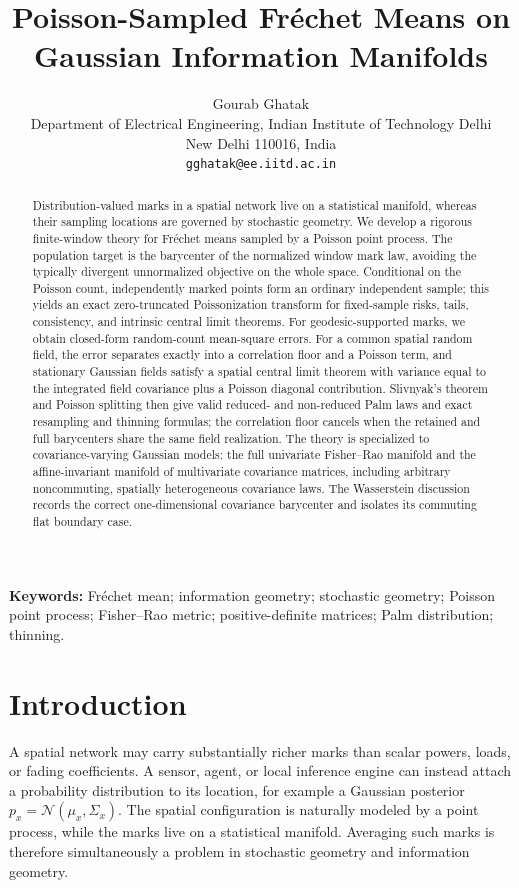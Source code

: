 \documentclass[11pt,a4paper]{article}
\title{Poisson-Sampled Fr\'echet Means on Gaussian Information Manifolds}
\author{Gourab Ghatak\\
\small Department of Electrical Engineering, Indian Institute of Technology Delhi\\
\small New Delhi 110016, India\\
\small \texttt{gghatak@ee.iitd.ac.in}}
\date{}
\theoremstyle{remark}
\begin{document}
\maketitle

\begin{abstract}
Distribution-valued marks in a spatial network live on a statistical manifold, whereas their sampling locations are governed by stochastic geometry.  We develop a rigorous finite-window theory for Fr\'echet means sampled by a Poisson point process.  The population target is the barycenter of the normalized window mark law, avoiding the typically divergent unnormalized objective on the whole space.  Conditional on the Poisson count, independently marked points form an ordinary independent sample; this yields an exact zero-truncated Poissonization transform for fixed-sample risks, tails, consistency, and intrinsic central limit theorems.  For geodesic-supported marks, we obtain closed-form random-count mean-square errors.  For a common spatial random field, the error separates exactly into a correlation floor and a Poisson term, and stationary Gaussian fields satisfy a spatial central limit theorem with variance equal to the integrated field covariance plus a Poisson diagonal contribution.  Slivnyak's theorem and Poisson splitting then give valid reduced- and non-reduced Palm laws and exact resampling and thinning formulas; the correlation floor cancels when the retained and full barycenters share the same field realization.  The theory is specialized to covariance-varying Gaussian models: the full univariate Fisher--Rao manifold and the affine-invariant manifold of multivariate covariance matrices, including arbitrary noncommuting, spatially heterogeneous covariance laws.  The Wasserstein discussion records the correct one-dimensional covariance barycenter and isolates its commuting flat boundary case.
\end{abstract}

\noindent\textbf{Keywords:} Fr\'echet mean; information geometry; stochastic geometry; Poisson point process; Fisher--Rao metric; positive-definite matrices; Palm distribution; thinning.
\medskip

\section{Introduction}
\label{sec:introduction}

A spatial network may carry substantially richer marks than scalar powers, loads, or fading coefficients.  A sensor, agent, or local inference engine can instead attach a probability distribution to its location, for example a Gaussian posterior
\(p_x=\mathcal N(\mu_x,\Sigma_x)\).  The spatial configuration is naturally modeled by a point process, while the marks live on a statistical manifold.  Averaging such marks is therefore simultaneously a problem in stochastic geometry and information geometry.
\end{document}
